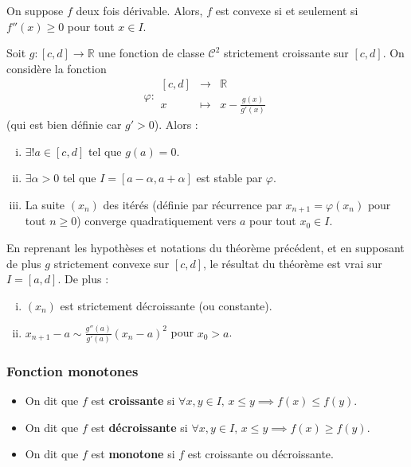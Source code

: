 	\begin{proposition}
		On suppose $f$ deux fois dérivable. Alors, $f$ est convexe si et seulement si $f''(x) \geq 0$ pour tout $x \in I$.
	\end{proposition}


	\begin{application}
		Soit $g : [c, d] \rightarrow \mathbb{R}$ une fonction de classe $\mathcal{C}^2$ strictement croissante sur $[c, d]$. On considère la fonction
		\[ \varphi :
		\begin{array}{ccc}
			[c, d] &\rightarrow& \mathbb{R} \\
			x &\mapsto& x - \frac{g(x)}{g'(x)}
		\end{array}
		\]
		(qui est bien définie car $g' > 0$). Alors :
		\begin{enumerate}[(i)]
			\item $\exists! a \in [c, d]$ tel que $g(a) = 0$.
			\item $\exists \alpha > 0$ tel que $I = [a - \alpha, a + \alpha]$ est stable par $\varphi$.
			\item La suite $(x_n)$ des itérés (définie par récurrence par $x_{n+1} = \varphi(x_n)$ pour tout $n \geq 0$) converge quadratiquement vers $a$ pour tout $x_0 \in I$.
		\end{enumerate}
	\end{application}

	\begin{corollary}
		En reprenant les hypothèses et notations du théorème précédent, et en supposant de plus $g$ strictement convexe sur $[c, d]$, le résultat du théorème est vrai sur $I = [a, d]$. De plus :
		\begin{enumerate}[(i)]
			\item $(x_n)$ est strictement décroissante (ou constante).
			\item $x_{n+1} - a \sim \frac{g''(a)}{g'(a)} (x_n - a)^2$ pour $x_0 > a$.
		\end{enumerate}
	\end{corollary}

	\newpage
	\subsubsection{Fonction monotones}


	\begin{definition}
		\begin{itemize}
			\item On dit que $f$ est \textbf{croissante} si $\forall x, y \in I, \, x \leq y \implies f(x) \leq f(y)$.
			\item On dit que $f$ est \textbf{décroissante} si $\forall x, y \in I, \, x \leq y \implies f(x) \geq f(y)$.
			\item On dit que $f$ est \textbf{monotone} si $f$ est croissante ou décroissante.
		\end{itemize}
	\end{definition}

